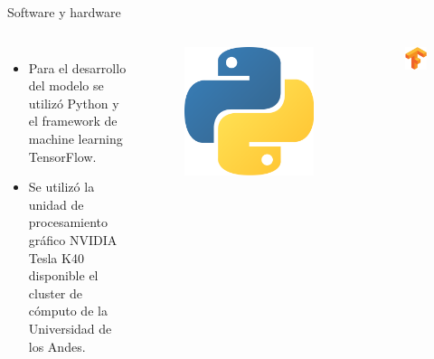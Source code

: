 \documentclass[12pt,aspectratio=169]{beamer}
\begin{document}
\begin{frame}{Software y hardware}

    \begin{columns}[c] 
            \begin{itemize}
                \item Para el desarrollo del modelo se utilizó Python y el framework de machine learning TensorFlow.
                \vspace{8mm}
                \item Se utilizó la unidad de procesamiento gráfico NVIDIA Tesla K40 disponible el cluster de cómputo de la Universidad de los Andes.
            \end{itemize}
            \begin{figure}
                \includegraphics[scale=0.04]{figs/python}
            \end{figure}
            \vspace*{-4mm}
            \begin{figure}
                \includegraphics[scale=0.3]{figs/tensorflow.png}

\end{figure}
\end{columns}
\end{frame}
\end{document}
